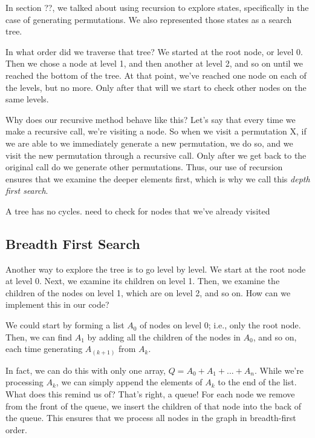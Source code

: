 In section ??, we talked about using recursion to explore states, specifically in the case of generating permutations. We also represented those states as a search tree.


In what order did we traverse that tree? We started at the root node, or level 0. Then we chose a node at level 1, and then another at level 2, and so on until we reached the bottom of the tree. At that point, we've reached one node on each of the levels, but no more. Only after that will we start to check other nodes on the same levels.

Why does our recursive method behave like this? Let's say that every time we make a recursive call, we're visiting a node. So when we visit a permutation X, if we are able to we immediately generate a new permutation, we do so, and we visit the new permutation through a recursive call. Only after we get back to the original call do we generate other permutations. Thus, our use of recursion ensures that we examine the deeper elements first, which is why we call this \textit{depth first search}.

A tree has no cycles. need to check for nodes that we've already visited


\subsection{Breadth First Search}

Another way to explore the tree is to go level by level. We start at the root node at level 0. Next, we examine its children on level 1. Then, we examine the children of the nodes on level 1, which are on level 2, and so on. How can we implement this in our code?

We could start by forming a list $A_0$ of nodes on level 0; i.e., only the root node. Then, we can find $A_1$ by adding all the children of the nodes in $A_0$, and so on, each time generating $A_(k+1)$ from $A_k$.

In fact, we can do this with only one array, $Q = A_0 + A_1 + ... + A_n$. While we're processing $A_k$, we can simply append the elements of $A_k$ to the end of the list. What does this remind us of? That's right, a queue! For each node we remove from the front of the queue, we insert the children of that node into the back of the queue. This ensures that we process all nodes in the graph in breadth-first order.


